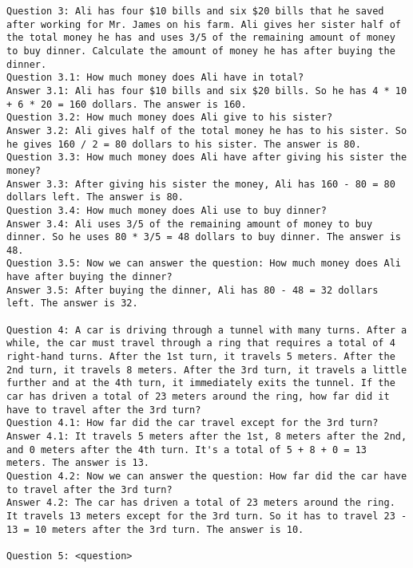 \begin{lstlisting}[breaklines=true,breakatwhitespace=true]
Question 3: Ali has four $10 bills and six $20 bills that he saved after working for Mr. James on his farm. Ali gives her sister half of the total money he has and uses 3/5 of the remaining amount of money to buy dinner. Calculate the amount of money he has after buying the dinner.
Question 3.1: How much money does Ali have in total?
Answer 3.1: Ali has four $10 bills and six $20 bills. So he has 4 * 10 + 6 * 20 = 160 dollars. The answer is 160.
Question 3.2: How much money does Ali give to his sister?
Answer 3.2: Ali gives half of the total money he has to his sister. So he gives 160 / 2 = 80 dollars to his sister. The answer is 80.
Question 3.3: How much money does Ali have after giving his sister the money?
Answer 3.3: After giving his sister the money, Ali has 160 - 80 = 80 dollars left. The answer is 80.
Question 3.4: How much money does Ali use to buy dinner?
Answer 3.4: Ali uses 3/5 of the remaining amount of money to buy dinner. So he uses 80 * 3/5 = 48 dollars to buy dinner. The answer is 48.
Question 3.5: Now we can answer the question: How much money does Ali have after buying the dinner?
Answer 3.5: After buying the dinner, Ali has 80 - 48 = 32 dollars left. The answer is 32.

Question 4: A car is driving through a tunnel with many turns. After a while, the car must travel through a ring that requires a total of 4 right-hand turns. After the 1st turn, it travels 5 meters. After the 2nd turn, it travels 8 meters. After the 3rd turn, it travels a little further and at the 4th turn, it immediately exits the tunnel. If the car has driven a total of 23 meters around the ring, how far did it have to travel after the 3rd turn?
Question 4.1: How far did the car travel except for the 3rd turn?
Answer 4.1: It travels 5 meters after the 1st, 8 meters after the 2nd, and 0 meters after the 4th turn. It's a total of 5 + 8 + 0 = 13 meters. The answer is 13.
Question 4.2: Now we can answer the question: How far did the car have to travel after the 3rd turn?
Answer 4.2: The car has driven a total of 23 meters around the ring. It travels 13 meters except for the 3rd turn. So it has to travel 23 - 13 = 10 meters after the 3rd turn. The answer is 10.

Question 5: <question>
\end{lstlisting}

